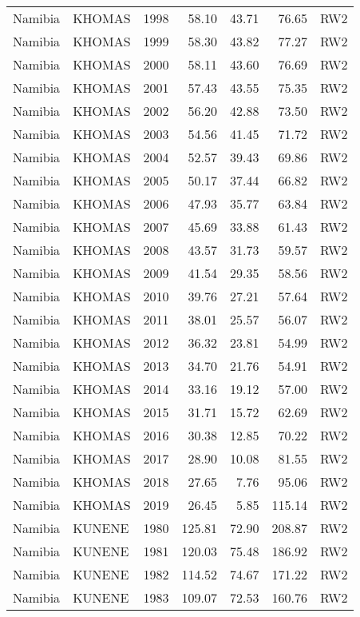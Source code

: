 \begin{longtable}{lllrrrl}
  Namibia & KHOMAS & 1998 & 58.10 & 43.71 & 76.65 & RW2 \\ 
  Namibia & KHOMAS & 1999 & 58.30 & 43.82 & 77.27 & RW2 \\ 
  Namibia & KHOMAS & 2000 & 58.11 & 43.60 & 76.69 & RW2 \\ 
  Namibia & KHOMAS & 2001 & 57.43 & 43.55 & 75.35 & RW2 \\ 
  Namibia & KHOMAS & 2002 & 56.20 & 42.88 & 73.50 & RW2 \\ 
  Namibia & KHOMAS & 2003 & 54.56 & 41.45 & 71.72 & RW2 \\ 
  Namibia & KHOMAS & 2004 & 52.57 & 39.43 & 69.86 & RW2 \\ 
  Namibia & KHOMAS & 2005 & 50.17 & 37.44 & 66.82 & RW2 \\ 
  Namibia & KHOMAS & 2006 & 47.93 & 35.77 & 63.84 & RW2 \\ 
  Namibia & KHOMAS & 2007 & 45.69 & 33.88 & 61.43 & RW2 \\ 
  Namibia & KHOMAS & 2008 & 43.57 & 31.73 & 59.57 & RW2 \\ 
  Namibia & KHOMAS & 2009 & 41.54 & 29.35 & 58.56 & RW2 \\ 
  Namibia & KHOMAS & 2010 & 39.76 & 27.21 & 57.64 & RW2 \\ 
  Namibia & KHOMAS & 2011 & 38.01 & 25.57 & 56.07 & RW2 \\ 
  Namibia & KHOMAS & 2012 & 36.32 & 23.81 & 54.99 & RW2 \\ 
  Namibia & KHOMAS & 2013 & 34.70 & 21.76 & 54.91 & RW2 \\ 
  Namibia & KHOMAS & 2014 & 33.16 & 19.12 & 57.00 & RW2 \\ 
  Namibia & KHOMAS & 2015 & 31.71 & 15.72 & 62.69 & RW2 \\ 
  Namibia & KHOMAS & 2016 & 30.38 & 12.85 & 70.22 & RW2 \\ 
  Namibia & KHOMAS & 2017 & 28.90 & 10.08 & 81.55 & RW2 \\ 
  Namibia & KHOMAS & 2018 & 27.65 & 7.76 & 95.06 & RW2 \\ 
  Namibia & KHOMAS & 2019 & 26.45 & 5.85 & 115.14 & RW2 \\ 
  Namibia & KUNENE & 1980 & 125.81 & 72.90 & 208.87 & RW2 \\ 
  Namibia & KUNENE & 1981 & 120.03 & 75.48 & 186.92 & RW2 \\ 
  Namibia & KUNENE & 1982 & 114.52 & 74.67 & 171.22 & RW2 \\ 
  Namibia & KUNENE & 1983 & 109.07 & 72.53 & 160.76 & RW2 \\ 

\end{longtable}
